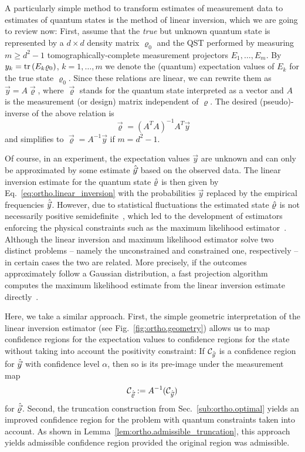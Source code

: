 A particularly simple method to transform estimates of measurement data to estimates of quantum states is the method of linear inversion, which we are going to review now:
First, assume that the \emph{true} but unknown quantum state is represented by a $d\times d$ density matrix $\varrho_0$ and the QST performed by measuring $m\geq d^{2} - 1$ tomographically-complete measurement projectors $E_{1},\ldots,E_{m}$.
By $y_{k}=\operatorname{tr}\left(E_{k}\varrho_0\right)$, $k=1,\ldots,m$ we denote the (quantum) expectation values of $E_{k}$ for the true state $\varrho_0$.
Since these relations are linear, we can rewrite them as $\vec{y} = A \vec{\varrho}$, where $\vec{\varrho}$ stands for the quantum state interpreted as a vector and $A$ is the measurement (or design) matrix independent of $\varrho$.
The desired (pseudo)-inverse of the above relation is
\begin{equation}
  \label{eq:ortho.linear_inversion}
  \vec{\varrho}={\left(A^{T}A\right)}^{-1}A^{T}\vec{y}
\end{equation}
and simplifies to $\vec{\varrho}=A^{-1}\vec{y}$ if $m=d^{2} - 1$.

Of course, in an experiment, the expectation values $\vec{y}$ are unknown and can only be approximated by some estimate $\hat{\vec y}$ based on the observed data.
The linear inversion estimate for the quantum state $\hat{\varrho}$ is then given by Eq.~\eqref{eq:ortho.linear_inversion} with the probabilities $\vec y$ replaced by the empirical frequencies $\hat{\vec y}$.
However, due to statistical fluctuations the estimated state $\hat{\varrho}$ is not necessarily positive semidefinite~\cite{Knips_2015_How}, which led to the development of estimators enforcing the physical constraints such as the maximum likelihood estimator~\cite{Hradil_2004_3}.
Although the linear inversion and maximum likelihood estimator solve two distinct problems -- namely the unconstrained and constrained one, respectively -- in certain cases the two are related.
 More precisely, if the outcomes approximately follow a Gaussian distribution, a fast projection algorithm computes the maximum likelihood estimate from the linear inversion estimate directly~\cite{Smolin_2012_Maximum}.

Here, we take a similar approach.
First, the simple geometric interpretation of the linear inversion estimator (see Fig.~\ref{fig:ortho.geometry}) allows us to map confidence regions for the expectation values to confidence regions for the state without taking into account the positivity constraint:
If $\mathcal{C}_{\hat{\vec y}}$ is a confidence region for $\hat{\vec y}$ with confidence level $\alpha$, then so is its pre-image under the measurement map
\begin{equation}
  \label{eq:ortho.linear_confidence}
  \mathcal{C}_{\hat{\vec \varrho}} := A^{-1}(\mathcal{C}_{\hat{\vec y}})
\end{equation}
for $\hat{\vec \varrho}$.
Second, the truncation construction from Sec.~\ref{sub:ortho.optimal} yields an improved confidence region for the problem with quantum constraints taken into account.
As shown in Lemma~\ref{lem:ortho.admissible_truncation}, this approach yields admissible confidence region provided the original region was admissible.

